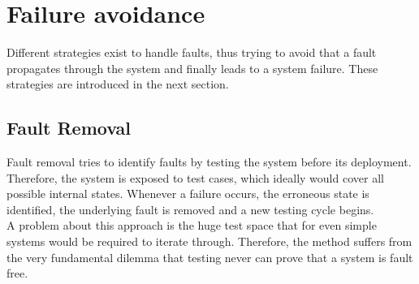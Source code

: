 \section{Failure avoidance}

Different strategies exist to handle faults, thus trying to avoid that a fault propagates through the system and finally leads to a system failure.
These strategies are introduced in the next section.

\subsection{Fault Removal}
Fault removal tries to identify faults by testing the system before its deployment. 
\\
Therefore, the system is exposed to test cases, which ideally would cover all possible internal states. Whenever a failure occurs, the erroneous state is identified, the
underlying fault is removed and a new testing cycle begins.
\\
A problem about this approach is the huge test space that for even simple systems would be required to iterate through. Therefore, the method suffers from the very
fundamental dilemma that testing never can prove that a system is fault free.
